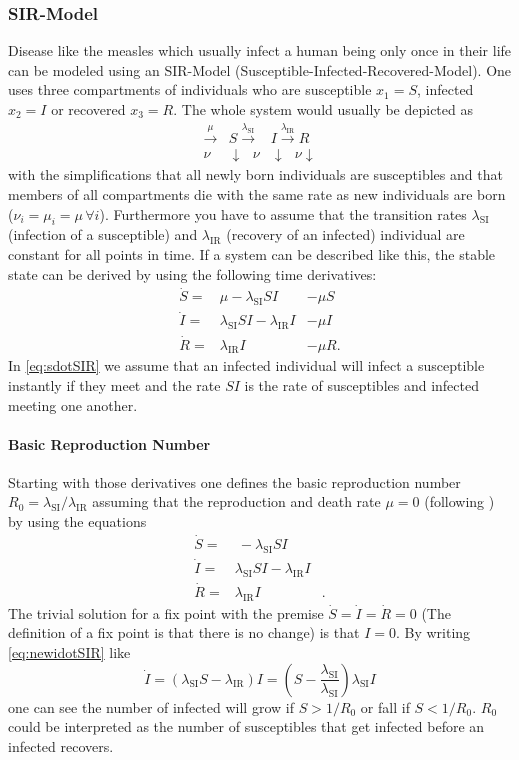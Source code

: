 \subsubsection{SIR-Model}
Disease like the measles which usually infect a human being only once in their life can be modeled using an SIR-Model (Susceptible-Infected-Recovered-Model). One uses three compartments of individuals who are susceptible $x_1 = S$, infected $x_2=I$ or recovered $x_3=R$. The whole system would usually be depicted as 
\begin{eqnarray}
\xrightarrow{\mu} &S \xrightarrow{\lambda_\text{SI}} &I  \xrightarrow{\lambda_\text{IR}} R  \\
{\nu} & \downarrow \text{         }\nu &\downarrow \text{  } {\nu} \downarrow \nonumber
\end{eqnarray}
with the simplifications that all newly born individuals are susceptibles and that members of all compartments die with the same rate as new individuals are born ($\nu_i = \mu_i = \mu\, \forall i$). Furthermore you have to assume that the transition rates $\lambda_\text{SI}$ (infection of a susceptible) and $\lambda_\text{IR}$ (recovery of an infected) individual are constant for all points in time.
If a system can be described like this, the stable state can be derived by using the following time derivatives:
\begin{eqnarray}
\dot{S} =& \mu -\lambda_\text{SI} SI &-  \mu S  \label{eq:sdotSIR}\\ 
\dot{I} =& \lambda_\text{SI} SI - \lambda_\text{IR} I  &-\mu I \\
\dot{R} =& \lambda_\text{IR} I & -\mu R. \label{eq:rdotsir}
\end{eqnarray}
In \ref{eq:sdotSIR} we assume that an infected individual will infect a susceptible instantly if they meet and the rate $SI$ is the rate of susceptibles and infected meeting one another. 
\paragraph{Basic Reproduction Number}
Starting with those derivatives one defines the basic reproduction number $R_0=\lambda_\text{SI} / \lambda_\text{IR}$ assuming that the reproduction and death rate $\mu=0$ (following \citep{AND92}) by using the equations
\begin{eqnarray}
\dot{S} =& \ -\lambda_\text{SI} SI &  \label{eq:newsdotSIR}\\ 
\dot{I} =& \lambda_\text{SI} SI - \lambda_\text{IR} I  & \label{eq:newidotSIR}\\
\dot{R} =& \lambda_\text{IR} I &.
\end{eqnarray}
The trivial solution for a fix point with the premise $\dot{S} = \dot{I} =\dot{R} = 0$ (The definition of a fix point is that there is no change) is that $I=0$. By writing \ref{eq:newidotSIR} like 
\begin{equation}
\dot{I} = (\lambda_\text{SI} S -\lambda_\text{IR}) I = \left( S-\frac{\lambda_\text{SI}}{\lambda_\text{SI}} \right) \lambda_\text{SI} I
\end{equation}
one can see the number of infected will grow if $S > 1/R_0$ or fall if $S < 1/R_0$. $R_0$ could be interpreted as the number of susceptibles that get infected before an infected recovers.
